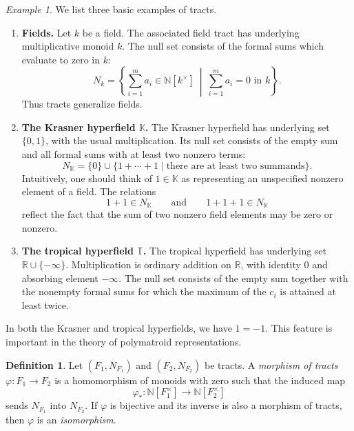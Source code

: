 \documentclass[11pt]{article}
\theoremstyle{definition}
\newtheorem{definition}[theorem]{Definition}
\theoremstyle{remark}
\newtheorem{example}[theorem]{Example}
\newcommand{\R}{\mathbb{R}}
\begin{document}
\begin{example}
    We list three basic examples of tracts.
    \begin{enumerate}
        \item \textbf{Fields.} Let $k$ be a field. The associated field tract has underlying multiplicative monoid $k$. The null set consists of the formal sums which evaluate to zero in $k$:
        \[
            N_k
            =
            \left\{
                \sum_{i=1}^m a_i \in \mathbb{N}[k^\times]
                \ \middle|\
                \sum_{i=1}^m a_i=0 \text{ in } k
            \right\}.
        \]
        Thus tracts generalize fields.

        \item \textbf{The Krasner hyperfield $\mathbb{K}$.} The Krasner hyperfield has underlying set $\{0,1\}$, with the usual multiplication. Its null set consists of the empty sum and all formal sums with at least two nonzero terms:
        \[
            N_{\mathbb{K}}
            =
            \{0\}
            \cup
            \{1+\cdots+1 \mid \text{there are at least two summands}\}.
        \]
        Intuitively, one should think of $1\in\mathbb{K}$ as representing an unspecified nonzero element of a field. The relations
        \[
            1+1\in N_{\mathbb{K}}
            \qquad\text{and}\qquad
            1+1+1\in N_{\mathbb{K}}
        \]
        reflect the fact that the sum of two nonzero field elements may be zero or nonzero.

        \item \textbf{The tropical hyperfield $\mathbb{T}$.} The tropical hyperfield has underlying set $\R\cup\{-\infty\}$. Multiplication is ordinary addition on $\R$, with identity $0$ and absorbing element $-\infty$. The null set consists of the empty sum together with the nonempty 
        formal sums for which the maximum of the $c_i$ is attained at least twice.
    \end{enumerate}
    In both the Krasner and tropical hyperfields, we have $1=-1$. This feature is important in the theory of polymatroid representations.
\end{example}

\begin{definition}
    Let $(F_1,N_{F_1})$ and $(F_2,N_{F_2})$ be tracts. A \emph{morphism of tracts} $\varphi\colon F_1\to F_2$ is a homomorphism of monoids with zero such that the induced map
    \[
        \varphi_* \colon \mathbb{N}[F_1^\times]\to \mathbb{N}[F_2^\times]
    \]
    sends $N_{F_1}$ into $N_{F_2}$. If $\varphi$ is bijective and its inverse is also a morphism of tracts, then $\varphi$ is an \emph{isomorphism}.
\end{definition}
\end{document}
